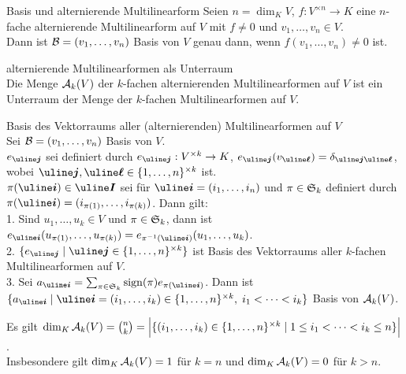 \begin{Satz}{Basis und alternierende Multilinearform}
    Seien $n = \dim_K V$, $f: V^{\times n} \rightarrow K$ eine $n$-fache
    alternierende Multilinearform auf $V$ mit $f \not= 0$
    und $v_1, \dotsc, v_n \in V$. \\
    Dann ist $\mathcal{B} = (v_1, \dotsc, v_n)$ Basis von $V$ genau dann,
    wenn $f(v_1, \dotsc, v_n) \not= 0$ ist.
\end{Satz}

\begin{Satz}{alternierende Multilinearformen als Unterraum} \\
    Die Menge $\mathcal{A}_k(V)$ der $k$-fachen alternierenden Multilinearformen
    auf $V$ ist ein Unterraum der Menge der $k$-fachen Multilinearformen
    auf $V$.
\end{Satz}

\begin{Satz}{Basis des Vektorraums aller (alternierenden) Multilinearformen
             auf $V$} \\
    Sei $\mathcal{B} = (v_1, \dotsc, v_n)$ Basis von $V$. \\
    $e_\mi{j}$ sei definiert durch $e_\mi{j}: V^{\times k} \rightarrow K$,
    $e_\mi{j}(v_\mi{\ell}) = \delta_{\mi{j} \mi{\ell}}$, wobei
    $\mi{j}, \mi{\ell} \in \{1, \dotsc, n\}^{\times k}$ ist. \\
    $\pi(\mi{i}) \in \mi{I}$ sei für $\mi{i} = (i_1, \dotsc, i_n)$ und
    $\pi \in \mathfrak{S}_k$ definiert durch
    $\pi(\mi{i}) = (i_{\pi(1)}, \dotsc, i_{\pi(k)})$.
    Dann gilt: \\
    1. Sind $u_1, \dotsc, u_k \in V$ und $\pi \in \mathfrak{S}_k$, dann ist
    $e_\mi{i}(u_{\pi(1)}, \dotsc, u_{\pi(k)}) =
    e_{\pi^{-1}(\mi{i})}(u_1, \dotsc, u_k)$. \\
    2. $\{e_\mi{j} \;|\; \mi{j} \in \{1, \dotsc, n\}^{\times k}\}$ ist
    Basis des Vektorraums aller $k$-fachen Multilinearformen auf $V$. \\
    3. Sei $a_\mi{i} = \sum_{\pi \in \perm_k} \sign(\pi) e_{\pi(\mi{i})}$.
    Dann ist $\{a_\mi{i} \;|\; \mi{i} =
    (i_1, \dotsc, i_k) \in \{1, \dotsc, n\}^{\times k},\; i_1 < \dotsb < i_k\}$
    Basis von $\mathcal{A}_k(V)$.
\end{Satz}

\begin{Kor}
    Es gilt $\dim_K \mathcal{A}_k(V) = \binom{n}{k} =
    \Big|\{(i_1, \dotsc, i_k) \in \{1, \dotsc, n\}^{\times k} \;|\;
    1 \le i_1 < \dotsb < i_k \le n\}\Big|$. \\
    Insbesondere gilt $\dim_K \mathcal{A}_k(V) = 1$ für $k = n$ und
    $\dim_K \mathcal{A}_k(V) = 0$ für $k > n$.
\end{Kor}

